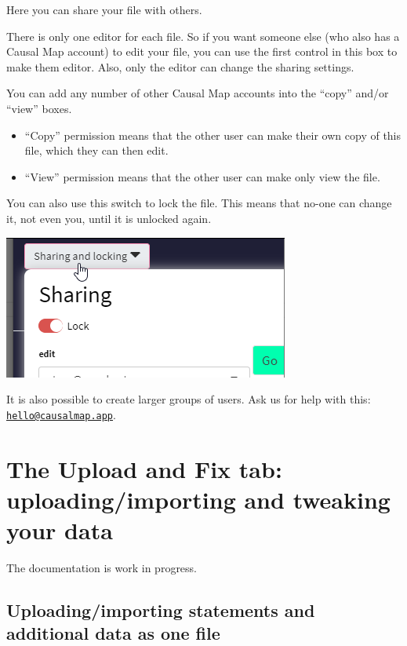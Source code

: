 \documentclass[
]{book}
\begin{document}
Here you can share your file with others.

There is only one editor for each file. So if you want someone else (who also has a Causal Map account) to edit your file, you can use the first control in this box to make them editor. Also, only the editor can change the sharing settings.

You can add any number of other Causal Map accounts into the ``copy'' and/or ``view'' boxes.

\begin{itemize}
\item
  ``Copy'' permission means that the other user can make their own copy of this file, which they can then edit.
\item
  ``View'' permission means that the other user can make only view the file.
\end{itemize}

You can also use this switch to lock the file. This means that no-one can change it, not even you, until it is unlocked again.

\includegraphics{_assets/110002.png}

It is also possible to create larger groups of users. Ask us for help with this: \href{mailto:hello@causalmap.app}{\nolinkurl{hello@causalmap.app}}.

\hypertarget{the-upload-and-fix-tab-uploadingimporting-and-tweaking-your-data}{%
\section{The Upload and Fix tab: uploading/importing and tweaking your data}\label{the-upload-and-fix-tab-uploadingimporting-and-tweaking-your-data}}

The documentation is work in progress.

\hypertarget{uploadingimporting-statements-and-additional-data-as-one-file}{%
\subsection{Uploading/importing statements and additional data as one file}\label{uploadingimporting-statements-and-additional-data-as-one-file}}
\end{document}
